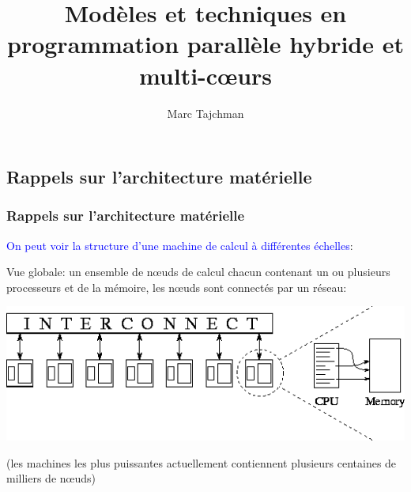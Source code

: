 \documentclass{beamer}
\title{Modèles et techniques en programmation parallèle hybride et multi-c\oe urs}
\author{Marc Tajchman}\institute{CEA - DEN/DM2S/STMF/LMES}
\begin{document}
\begin{frame}
\titlepage
\end{frame}

\Large
\begin{frame}
  	\tableofcontents
\end{frame}

\begin{frame}
\section{Rappels sur l'architecture mat\'erielle}
\frametitle{Rappels sur l'architecture mat\'erielle}
\textcolor{blue}{On peut voir la structure d'une machine de calcul \`a diff\'erentes \'echelles}:
\vfill

Vue globale: un ensemble de n\oe uds de calcul chacun contenant un ou plusieurs processeurs et de la m\'emoire, les n\oe uds sont connect\'es par un r\'eseau:

\vfill
\begin{center}
\includegraphics[scale=0.4]{../Images/img100}
\end{center}

(les machines les plus puissantes actuellement contiennent plusieurs centaines de milliers de n\oe uds)
\end{frame}
\end{document}
